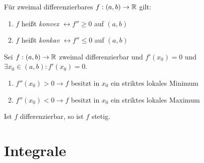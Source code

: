 \documentclass[]{article}
\begin{document}
\begin{definition}
	Für zweimal differenzierbares $f : (a,b) \rightarrow \mathbb{R}$ gilt:
	\begin{enumerate}[noitemsep]
		\item $f$ heißt \emph{konvex} $\leftrightarrow f'' \geq 0$ auf $(a,b)$
		\item $f$ heißt \emph{konkav} $\leftrightarrow f'' \leq 0$ auf $(a,b)$		
	\end{enumerate}
\end{definition}

\begin{satz}
	Sei $f : (a,b) \rightarrow \mathbb{R}$ zweimal differenzierbar und $f'(x_0)=0$ und $\exists x_0 \in (a,b) : f'(x_0) = 0$.
	
	\begin{enumerate}[noitemsep]
		\item $f''(x_0) > 0 \rightarrow f$ besitzt in $x_0$ ein striktes lokales Minimum
		\item $f''(x_0) < 0 \rightarrow f$ besitzt in $x_0$ ein striktes lokales Maximum	
	\end{enumerate}
\end{satz}

\begin{satz}
	Ist $f$ differenzierbar, so ist $f$ stetig.
\end{satz}

\pagebreak

\section{Integrale}
\end{document}
